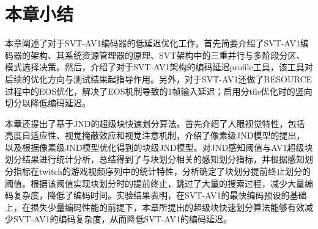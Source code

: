   \section{本章小结}
  本章阐述了对于SVT-AV1编码器的低延迟优化工作。首先简要介绍了SVT-AV1编码器的架构、其系统资源管理器的原理、SVT架构中的三重并行与多阶段分区、模式选择决策。然后，介绍了对于SVT-AV1架构的编码延迟profile工具，该工具对后续的优化方向与测试结果起指导作用。另外，对于SVT-AV1还做了RESOURCE过程中的EOS优化，解决了EOS机制导致的1帧输入延迟；启用分tile优化时的竖向切分以降低编码延迟。

  本章还提出了基于JND的超级块快速划分算法。首先介绍了人眼视觉特性，包括亮度自适应性、视觉掩蔽效应和视觉注意机制，介绍了像素级JND模型的提出，以及根据像素级JND模型优化得到的块级JND模型。对JND感知阈值与AV1超级块划分结果进行统计分析，总结得到了与块划分相关的感知划分指标，并根据感知划分指标在twitch的游戏视频序列中的统计特性，分析确定了块划分提前终止划分的阈值。根据该阈值实现块划分时的提前终止，跳过了大量的搜索过程，减少大量编码复杂度，降低了编码时间。实验结果表明，在SVT-AV1的最快编码预设的基础上，在损失少量编码性能的前提下，本章所提出的超级块快速划分算法能够有效减少SVT-AV1的编码复杂度，从而降低SVT-AV1的编码延迟。